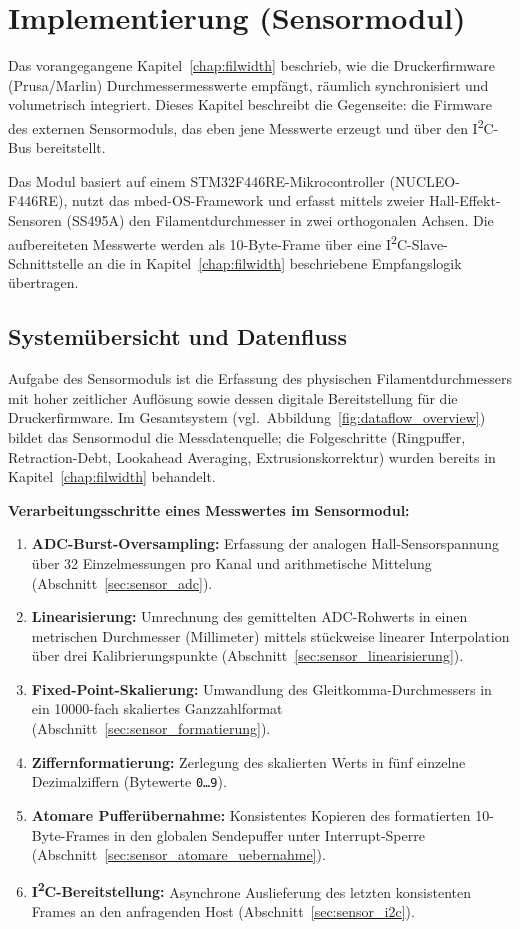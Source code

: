 \chapter{Implementierung (Sensormodul)}
\label{chap:sensormodul}

Das vorangegangene Kapitel~\ref{chap:filwidth} beschrieb, wie die Druckerfirmware (Prusa/Marlin) Durchmessermesswerte empfängt, räumlich synchronisiert und volumetrisch integriert.
Dieses Kapitel beschreibt die Gegenseite: die Firmware des externen Sensormoduls, das eben jene Messwerte erzeugt und über den I\textsuperscript{2}C-Bus bereitstellt.

Das Modul basiert auf einem STM32F446RE-Mikrocontroller (NUCLEO-F446RE), nutzt das mbed-OS-Framework und erfasst mittels zweier Hall-Effekt-Sensoren (SS495A) den Filamentdurchmesser in zwei orthogonalen Achsen.
Die aufbereiteten Messwerte werden als 10-Byte-Frame über eine I\textsuperscript{2}C-Slave-Schnittstelle an die in Kapitel~\ref{chap:filwidth} beschriebene Empfangslogik übertragen.

\section{Systemübersicht und Datenfluss}

Aufgabe des Sensormoduls ist die Erfassung des physischen Filamentdurchmessers mit hoher zeitlicher Auflösung sowie dessen digitale Bereitstellung für die Druckerfirmware.
Im Gesamtsystem (vgl.\ Abbildung~\ref{fig:dataflow_overview}) bildet das Sensormodul die Messdatenquelle; die Folgeschritte (Ringpuffer, Retraction-Debt, Lookahead Averaging, Extrusionskorrektur) wurden bereits in Kapitel~\ref{chap:filwidth} behandelt.

\textbf{Verarbeitungsschritte eines Messwertes im Sensormodul:}
\begin{enumerate}
  \item \textbf{ADC-Burst-Oversampling:} Erfassung der analogen Hall-Sensorspannung über \num{32} Einzelmessungen pro Kanal und arithmetische Mittelung (Abschnitt~\ref{sec:sensor_adc}).
  \item \textbf{Linearisierung:} Umrechnung des gemittelten ADC-Rohwerts in einen metrischen Durchmesser (Millimeter) mittels stückweise linearer Interpolation über drei Kalibrierungspunkte (Abschnitt~\ref{sec:sensor_linearisierung}).
  \item \textbf{Fixed-Point-Skalierung:} Umwandlung des Gleitkomma-Durchmessers in ein \num{10000}-fach skaliertes Ganzzahlformat (Abschnitt~\ref{sec:sensor_formatierung}).
  \item \textbf{Ziffernformatierung:} Zerlegung des skalierten Werts in fünf einzelne Dezimalziffern (Bytewerte \texttt{0\dots9}).
  \item \textbf{Atomare Pufferübernahme:} Konsistentes Kopieren des formatierten 10-Byte-Frames in den globalen Sendepuffer unter Interrupt-Sperre (Abschnitt~\ref{sec:sensor_atomare_uebernahme}).
  \item \textbf{I\textsuperscript{2}C-Bereitstellung:} Asynchrone Auslieferung des letzten konsistenten Frames an den anfragenden Host (Abschnitt~\ref{sec:sensor_i2c}).
\end{enumerate}

